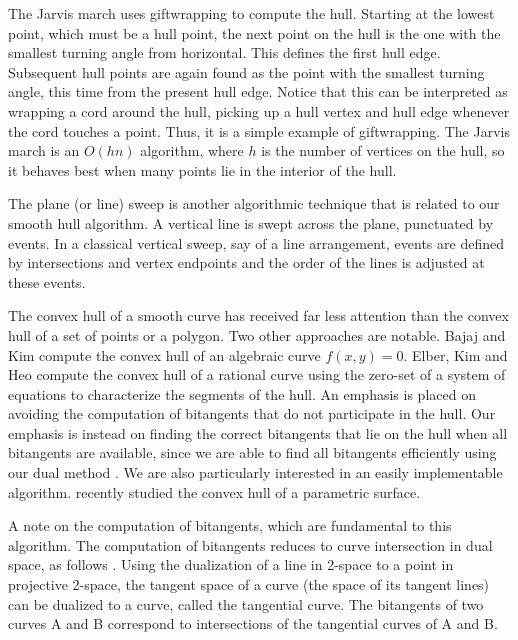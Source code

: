 \documentclass[11pt]{article}
\begin{document}
The Jarvis march \cite{jarvis73} uses giftwrapping to compute the hull.
Starting at the lowest point, which must be a hull point, the next point
on the hull is the one with the smallest turning angle from horizontal.
This defines the first hull edge.
Subsequent hull points are again found as the point with the smallest turning angle,
this time from the present hull edge.
Notice that this can be interpreted as wrapping a cord around the hull, picking
up a hull vertex and hull edge whenever the cord touches a point.
Thus, it is a simple example of giftwrapping.
The Jarvis march is an $O(hn)$ algorithm, where $h$ is the number of vertices on the hull,
so it behaves best when many points lie in the interior of the hull.

The plane (or line) sweep \cite{preparata85} %
is another algorithmic technique that is related to our smooth hull algorithm.
A vertical line is swept across the plane, punctuated by events.
In a classical vertical sweep, say of a line arrangement, events are
defined by intersections and vertex endpoints and the order of the lines 
is adjusted at these events.

The convex hull of a smooth curve has received far less attention
than the convex hull of a set of points or a polygon.
Two other approaches are notable.
Bajaj and Kim \cite{bajaj91} compute the convex hull of an algebraic curve $f(x,y)=0$.
Elber, Kim and Heo \cite{elber01} compute the convex hull of a rational curve
using the zero-set of a system of equations to characterize the segments of the hull.
An emphasis is placed on avoiding the computation of bitangents that do not participate
in the hull.
Our emphasis is instead on finding the correct bitangents that 
lie on the hull when all bitangents are available, since
we are able to find all bitangents efficiently using our dual method \cite{jj01}.
We are also particularly interested in an easily implementable algorithm.
\cite{seong04} recently studied the convex hull of a parametric surface.

A note on the computation of bitangents, which are fundamental to this algorithm.
The computation of bitangents reduces to curve intersection in dual space, as follows
\cite{jj01}.
Using the dualization of a line in 2-space to a point in projective 2-space,
the tangent space of a curve (the space of its tangent lines) can be dualized
to a curve, called the tangential curve.
The bitangents of two curves A and B 
correspond to intersections of the tangential curves of A and B.
\end{document}
